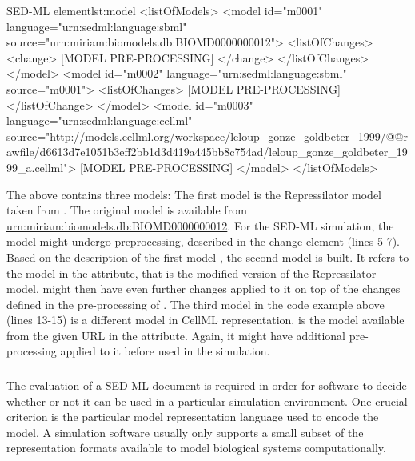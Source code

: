 
\begin{myXmlLst}{SED-ML  element}{lst:model}
<listOfModels>
 <model id="m0001" language="urn:sedml:language:sbml" 
  source="urn:miriam:biomodels.db:BIOMD0000000012">
  <listOfChanges>
   <change>
    [MODEL PRE-PROCESSING]
   </change>
   </listOfChanges> 
 </model>
 <model id="m0002" language="urn:sedml:language:sbml" source="m0001">
  <listOfChanges>
   [MODEL PRE-PROCESSING]
  </listOfChange>
 </model>
 <model id="m0003" language="urn:sedml:language:cellml" source="http://models.cellml.org/workspace/leloup_gonze_goldbeter_1999/@@rawfile/d6613d7e1051b3eff2bb1d3d419a445bb8c754ad/leloup_gonze_goldbeter_1999_a.cellml">
  [MODEL PRE-PROCESSING]
 </model>
</listOfModels>
\end{myXmlLst} 

The above  contains three models: The first model  is the Repressilator model taken from \biom. The original model is available from \url{urn:miriam:biomodels.db:BIOMD0000000012}. For the SED-ML simulation, the model might undergo preprocessing, described in the \hyperref[class:change]{change} element (lines 5-7). Based on the description of the first model , the second model is built. It refers to the model  in the  attribute, that is the modified version of the Repressilator model.  might then have even further changes applied to it on top of the changes defined in the pre-processing of . The third model in the code example above (lines 13-15) is a different model in CellML representation.  is the model available from the given URL in the  attribute. Again, it might have additional pre-processing applied to it before used in the simulation.


\subsubsection{}
\label{sec:language}
The evaluation of a SED-ML document is required in order for software to decide whether or not it can be used in a particular simulation environment. One crucial criterion is the particular model representation language used to encode the model. A simulation software usually only supports a small subset of the representation formats available to model biological systems computationally. 

